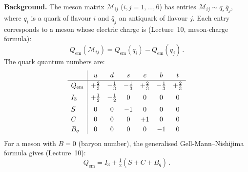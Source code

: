 \documentclass[11pt,a4paper]{article}
\begin{document}
\noindent\textbf{Background.}
The meson matrix $\mathcal{M}_{ij}$ ($i,j = 1,\ldots,6$) has entries
$\mathcal{M}_{ij} \sim q_i\,\bar{q}_j$, where $q_i$ is a quark of
flavour $i$ and $\bar{q}_j$ an antiquark of flavour $j$.  Each entry
corresponds to a meson whose electric charge is (Lecture~10, meson-charge
formula):
\begin{equation}\label{eq:meson-charge-ex}
  Q_{\text{em}}(\mathcal{M}_{ij})
  = Q_{\text{em}}(q_i) - Q_{\text{em}}(q_j)\,.
\end{equation}
The quark quantum numbers are:
\begin{equation}\label{eq:quark-qn-table}
\renewcommand{\arraystretch}{1.2}
\begin{array}{l|cccccc}
  & u & d & s & c & b & t \\
\hline
Q_{\text{em}} & +\tfrac{2}{3} & -\tfrac{1}{3} & -\tfrac{1}{3}
  & +\tfrac{2}{3} & -\tfrac{1}{3} & +\tfrac{2}{3} \\[3pt]
I_3 & +\tfrac{1}{2} & -\tfrac{1}{2} & 0 & 0 & 0 & 0 \\[3pt]
S & 0 & 0 & -1 & 0 & 0 & 0 \\
C & 0 & 0 & 0 & +1 & 0 & 0 \\
B_q & 0 & 0 & 0 & 0 & -1 & 0 \\
\end{array}
\end{equation}
For a meson with $B = 0$ (baryon number), the generalised
Gell-Mann--Nishijima formula gives (Lecture~10):
\begin{equation}\label{eq:GMN-ex}
  Q_{\text{em}} = I_3 + \tfrac{1}{2}(S + C + B_q)\,.
\end{equation}

\medskip
\end{document}
